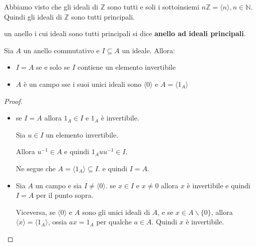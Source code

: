 \documentclass[../main.tex]{subfiles}
\begin{document}
\begin{example}
    Abbiamo visto che gli ideali di $\mathbb{Z} $ sono tutti e soli i sottoinsiemi $n \mathbb{Z}  = \langle n \rangle, n \in \mathbb{N} $.
    Quindi gli ideali di $\mathbb{Z} $ sono tutti principali.
\end{example}

\begin{definition}
    un anello i cui ideali sono tutti principali si dice \textbf{anello ad ideali principali}.
\end{definition}

\begin{proposition}
    Sia $A$ un anello commutativo e $I \subseteq A$ un ideale. Allora:
    \begin{itemize}
        \item $I = A$ se e solo se $I$ contiene un elemento invertibile
        \item $A$ è un campo sse i suoi unici ideali sono $\langle 0 \rangle$ e $A = \langle 1_A \rangle$
    \end{itemize}
\end{proposition}

\begin{proof}
    \
    \begin{itemize}
        \item se $I = A$ allora $1_A \in I$ e $1_A$ è invertibile.

              Sia $u \in I$ un elemento invertibile.

              Allora $u^{-1} \in A$ e quindi $1_A u u^{-1} \in I$.

              Ne segue che $A = \langle 1_A \rangle \subseteq I$. e quindi $I = A$.
        \item Sia $A$ un campo e sia $I \neq \langle 0 \rangle$. se $ x \in I$ e $x \neq 0$ allora $x$ è invertibile e quindi $I = A$
              per il punto sopra.

              Viceversa, se $\langle 0 \rangle$ e $A$ sono gli unici ideali di $A$,
              e se $x \in A  \backslash \{0\}$, allora $\langle x \rangle = \langle 1_A \rangle$, ossia $ax = 1_A$ per qualche $a \in A$. Quindi $x$ è invertibile.
    \end{itemize}
\end{proof}
\end{document}
